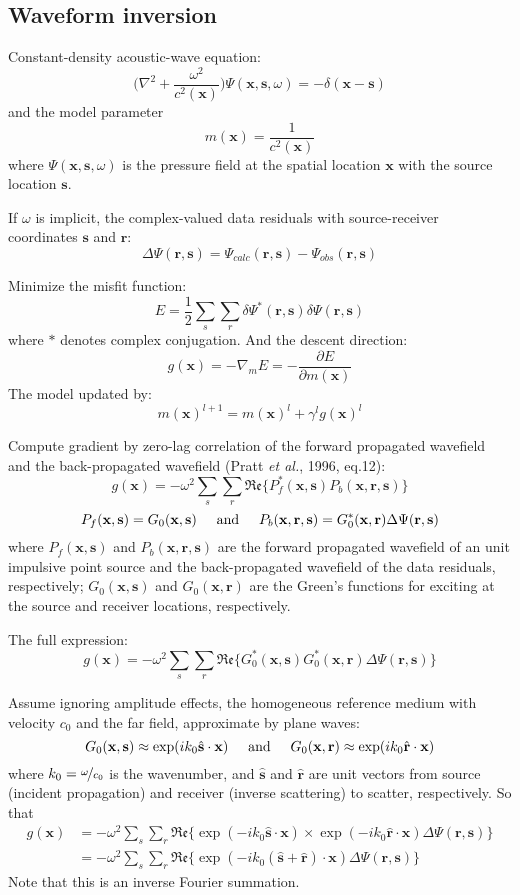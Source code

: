 \documentclass{article}
\newcommand{\mbf}[1]{\mathbf{#1}}
\newcommand{\myRe}{\mathfrak{Re}}
\newcommand{\etal}{\textit{et al.}}
\begin{document}
\subsection{Waveform inversion}
Constant-density acoustic-wave equation:
\[ \Big(\nabla^2+\frac{\omega^2}{c^2(\mbf x)}\Big)\Psi(\mbf x,\mbf s,\omega)=-\delta(\mbf x-\mbf s) \]
and the model parameter
\[ m(\mbf x)=\frac{1}{c^2(\mbf x)} \]
where $\Psi(\mbf x,\mbf s,\omega)$ is the pressure field at the spatial location $\mbf x$ with the source location $\mbf s$.\par
If $\omega$ is implicit, the complex-valued data residuals with source-receiver coordinates $\mbf s$ and $\mbf r$:
\[ \Delta\Psi(\mbf r,\mbf s)=\Psi_{calc}(\mbf r,\mbf s)-\Psi_{obs}(\mbf r,\mbf s) \]\par
Minimize the misfit function:
\[ E=\frac{1}{2}\sum_s\sum_r\delta\Psi^*(\mbf r,\mbf s)\delta\Psi(\mbf r,\mbf s) \]
where $*$ denotes complex conjugation. And the descent direction:
\[ g(\mbf x)=-\nabla_m E=-\frac{\partial E}{\partial m(\mbf x)} \]
The model updated by:
\[ m(\mbf x)^{l+1}=m(\mbf x)^l+\gamma^lg(\mbf x)^l \]\par
Compute gradient by zero-lag correlation of the forward propagated wavefield and the back-propagated wavefield (Pratt \etal, 1996, eq.12):
\[ g(\mbf x)=-\omega^2\sum_s\sum_r\myRe\{P_f^*(\mbf x,\mbf s)P_b(\mbf x,\mbf r,\mbf s)\} \]
\[ P_f(\mbf x,\mbf s)=G_0(\mbf x,\mbf s) \text{\hspace{5mm}and\hspace{5mm}} P_b(\mbf x,\mbf r,\mbf s)=G_0^*(\mbf x,\mbf r)\Delta\Psi(\mbf r,\mbf s) \]
where $P_f(\mbf x,\mbf s)$ and $P_b(\mbf x,\mbf r,\mbf s)$ are the forward propagated wavefield of an unit impulsive point source and the back-propagated wavefield of the data residuals, respectively; $G_0(\mbf x,\mbf s)$ and $G_0(\mbf x,\mbf r)$ are the Green's functions for exciting at the source and receiver locations, respectively.\par
The full expression:
\[ g(\mbf x)=-\omega^2\sum_s\sum_r\myRe\{G_0^*(\mbf x,\mbf s)G_0^*(\mbf x,\mbf r)\Delta\Psi(\mbf r,\mbf s)\} \]\par
Assume ignoring amplitude effects, the homogeneous reference medium with velocity $c_0$ and the far field, approximate by plane waves:
\[ G_0(\mbf x,\mbf s)\approx\exp(ik_0\hat{\mbf s}\cdot\mbf x) \text{\hspace{5mm}and\hspace{5mm}} G_0(\mbf x,\mbf r)\approx\exp(ik_0\hat{\mbf r}\cdot\mbf x) \]
where $k_0=\nicefrac{\omega}{c_0}$ is the wavenumber, and $\hat{\mbf s}$ and $\hat{\mbf r}$ are unit vectors from source (incident propagation) and receiver (inverse scattering) to scatter, respectively. So that
\begin{align*}
g(\mbf x) & =-\omega^2\sum_s\sum_r\myRe\{\exp(-ik_0\hat{\mbf s}\cdot\mbf x)\times\exp(-ik_0\hat{\mbf r}\cdot\mbf x)\Delta\Psi(\mbf r,\mbf s)\} \\
          & =-\omega^2\sum_s\sum_r\myRe\{\exp(-ik_0(\hat{\mbf s}+\hat{\mbf r})\cdot\mbf x)\Delta\Psi(\mbf r,\mbf s)\}
\end{align*}
Note that this is an inverse Fourier summation.\par
\end{document}
